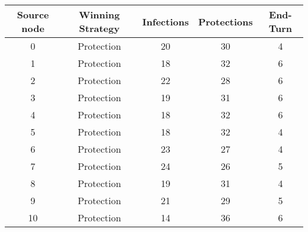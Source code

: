 \documentclass[results.tex]{subfiles}
\begin{document}
    \begin{center}
        \begin{tabular}{| c || c | c | c | c |}
            \hline
            {\bfseries Source node} & {\bfseries Winning Strategy} & {\bfseries Infections} & {\bfseries Protections}
            & {\bfseries End-Turn}
            \\  %
            \hline\hline
            0                       & Protection                   & 20                     & 30                      & 4                    \\
            \hline
            1                       & Protection                   & 18                     & 32                      & 6                    \\
            \hline
            2                       & Protection                   & 22                     & 28                      & 6                    \\
            \hline
            3                       & Protection                   & 19                     & 31                      & 6                    \\
            \hline
            4                       & Protection                   & 18                     & 32                      & 6                    \\
            \hline
            5                       & Protection                   & 18                     & 32                      & 4                    \\
            \hline
            6                       & Protection                   & 23                     & 27                      & 4                    \\
            \hline
            7                       & Protection                   & 24                     & 26                      & 5                    \\
            \hline
            8                       & Protection                   & 19                     & 31                      & 4                    \\
            \hline
            9                       & Protection                   & 21                     & 29                      & 5                    \\
            \hline
            10                      & Protection                   & 14                     & 36                      & 6                    \\

\end{tabular}
\end{center}
\end{document}
